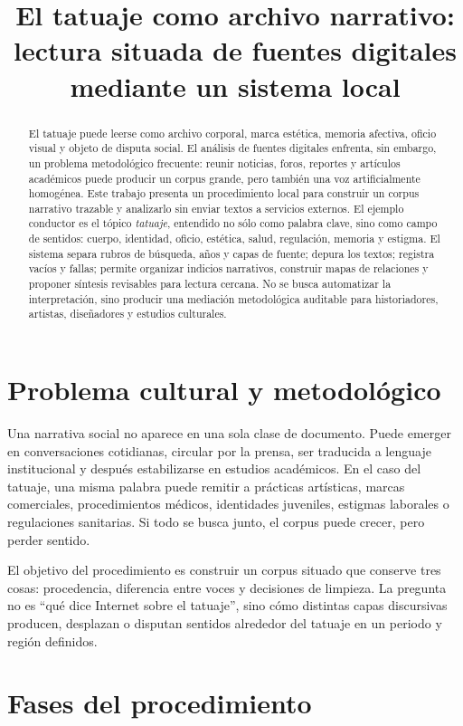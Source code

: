 \documentclass[11pt]{article}
\title{El tatuaje como archivo narrativo:\\ lectura situada de fuentes digitales mediante un sistema local}
\author{}
\date{}
\begin{document}
\maketitle

\begin{abstract}
El tatuaje puede leerse como archivo corporal, marca estética, memoria afectiva,
oficio visual y objeto de disputa social. El análisis de fuentes digitales
enfrenta, sin embargo, un problema metodológico frecuente: reunir noticias,
foros, reportes y artículos académicos puede producir un corpus grande, pero
también una voz artificialmente homogénea. Este trabajo presenta un
procedimiento local para construir un corpus narrativo trazable y analizarlo sin
enviar textos a servicios externos. El ejemplo conductor es el tópico
\textit{tatuaje}, entendido no sólo como palabra clave, sino como campo de
sentidos: cuerpo, identidad, oficio, estética, salud, regulación, memoria y
estigma. El sistema separa rubros de búsqueda, años y capas de fuente; depura
los textos; registra vacíos y fallas; permite organizar indicios narrativos,
construir mapas de relaciones y proponer síntesis revisables para lectura
cercana. No se
busca automatizar la interpretación, sino producir una mediación metodológica
auditable para historiadores, artistas, diseñadores y estudios culturales.
\end{abstract}

\section{Problema cultural y metodológico}

Una narrativa social no aparece en una sola clase de documento. Puede emerger en
conversaciones cotidianas, circular por la prensa, ser traducida a lenguaje
institucional y después estabilizarse en estudios académicos. En el caso del
tatuaje, una misma palabra puede remitir a prácticas artísticas, marcas
comerciales, procedimientos médicos, identidades juveniles, estigmas laborales o
regulaciones sanitarias. Si todo se busca junto, el corpus puede crecer, pero
perder sentido.

El objetivo del procedimiento es construir un corpus situado que conserve tres cosas:
procedencia, diferencia entre voces y decisiones de limpieza. La pregunta no es
``qué dice Internet sobre el tatuaje'', sino cómo distintas capas discursivas
producen, desplazan o disputan sentidos alrededor del tatuaje en un periodo y
región definidos.

\section{Fases del procedimiento}
\end{document}

